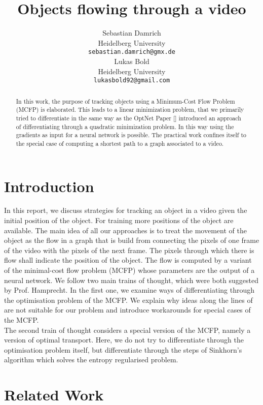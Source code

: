 \documentclass{article}
\title{Objects flowing through a video}
\author{
	Sebastian Damrich 
    \\
  Heidelberg University\\
  \texttt{sebastian.damrich@gmx.de} \\
   \And
   Lukas Bold  \\
   Heidelberg University \\
  \texttt{lukasbold92@gmail.com} \\
}
\begin{document}

\maketitle

\begin{abstract}
In this work, the purpose of tracking objects using a Minimum-Cost Flow Problem (MCFP) is elaborated. This leads to a linear minimization problem, that we primarily tried to differentiate in the same way as the OptNet Paper [] introduced an approach of differentiating through a quadratic minimization problem. In this way using the gradients as input for a neural network is possible. The practical work confines itself to the special case of computing a shortest path to a graph associated to a video. 
\end{abstract}


\section{Introduction}
In this report, we discuss strategies for tracking an object in a video given the initial position of the object. For training more positions of the object are available. The main idea of all our approaches is to treat the movement of the object as the flow in a graph that is build from connecting the pixels of one frame of the video with the pixels of the next frame. The pixels through which there is flow shall indicate the position of the object. The flow is computed by a variant of the minimal-cost flow problem (MCFP) whose parameters are the output of a neural network. We follow two main trains of thought, which were both suggested by Prof. Hamprecht. In the first one, we examine ways of differentiating through the optimisation problem of the MCFP. We explain why ideas along the lines of \cite{AmosK17} are not suitable for our problem and introduce workarounds for special cases of the MCFP.\\
The second train of thought considers a special version of the MCFP, namely a version of optimal transport. Here, we do not try to differentiate through the optimisation problem itself, but differentiate through the steps of Sinkhorn's algorithm which solves the entropy regularised problem.

\section{Related Work}
\end{document}
